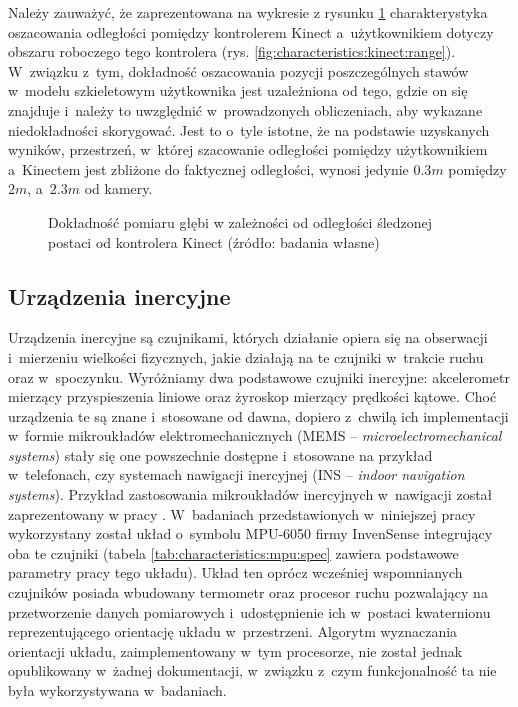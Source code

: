 Należy zauważyć, że zaprezentowana na wykresie z rysunku \ref{fig:characteristics:kinect:distanceAccuracy} charakterystyka oszacowania odległości pomiędzy kontrolerem Kinect a~użytkownikiem dotyczy obszaru roboczego tego kontrolera (rys. \ref{fig:characteristics:kinect:range}). W~związku z~tym, dokładność oszacowania pozycji poszczególnych stawów w~modelu szkieletowym użytkownika jest uzależniona od tego, gdzie on się znajduje i~należy to uwzględnić w~prowadzonych obliczeniach, aby wykazane niedokładności skorygować. Jest to o~tyle istotne, że na podstawie uzyskanych wyników, przestrzeń, w~której szacowanie odległości pomiędzy użytkownikiem a~Kinectem jest zbliżone do faktycznej odległości, wynosi jedynie $0.3m$ pomiędzy $2m$, a~$2.3m$ od kamery. 																																					
																																							
\begin{savenotes}
	\begin{figure}[!htb]
		\centering
											
		\caption[Dokładność pomiaru głębi w zależności od odległości śledzonej postaci od kontrolera Kinect]{Dokładność pomiaru głębi w zależności od odległości śledzonej postaci od kontrolera Kinect (źródło: badania własne)}
		\label{fig:characteristics:kinect:distanceAccuracy}
	\end{figure}
\end{savenotes}
																																								
\subsection{Urządzenia inercyjne}\label{sec:characteristics:imu}
																																								
Urządzenia inercyjne są czujnikami, których działanie opiera się na obserwacji i~mierzeniu wielkości fizycznych, jakie działają na te czujniki w~trakcie ruchu oraz w~spoczynku. Wyróżniamy dwa podstawowe czujniki inercyjne: akcelerometr mierzący przyspieszenia liniowe oraz żyroskop mierzący prędkości kątowe. Choć urządzenia te są znane i~stosowane od dawna, dopiero z~chwilą ich implementacji w~formie mikroukładów elektromechanicznych (MEMS -- \emph{microelectromechanical systems}) stały się one powszechnie dostępne i~stosowane na przykład w~telefonach, czy systemach nawigacji inercyjnej (INS -- \emph{indoor navigation systems}). Przykład zastosowania mikroukładów inercyjnych w~nawigacji został zaprezentowany w pracy \cite{Baranski2009, Baranski2011}. W~badaniach przedstawionych w~niniejszej pracy wykorzystany został układ o~symbolu MPU-6050 firmy InvenSense integrujący oba te czujniki (tabela \ref{tab:characteristics:mpu:spec} zawiera podstawowe parametry pracy tego układu). Układ ten oprócz wcześniej wspomnianych czujników posiada wbudowany termometr oraz procesor ruchu pozwalający na przetworzenie danych pomiarowych i~udostępnienie ich w~postaci kwaternionu reprezentującego orientację układu w~przestrzeni. Algorytm wyznaczania orientacji układu, zaimplementowany w~tym procesorze, nie został jednak opublikowany w~żadnej dokumentacji, w~związku z~czym funkcjonalność ta nie była wykorzystywana w~badaniach.
																																								
